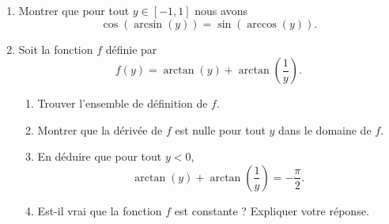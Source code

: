 
\begin{exercice}\label{exoanalyseCTU-0101}
    
    \begin{enumerate}
      \item Montrer que pour tout $y \in [-1,1]$ nous avons 
        \begin{equation}
          \cos (\arcsin(y)) = \sin(\arccos(y)).
        \end{equation}
        \item
          Soit la fonction $f$ définie par 
            \begin{equation}
               f(y)= \arctan(y)+\arctan\left(\frac{1}{ y }\right).
            \end{equation}
            \begin{enumerate}
            \item Trouver l'ensemble de définition de $f$.
              \item Montrer que la dérivée de $f$ est nulle pour tout $y$ dans le domaine de $f$.
              \item En déduire que pour tout \( y<0\),
            \begin{equation}
                \arctan(y)+\arctan\left(\frac{1}{ y }\right)=-\frac{ \pi }{ 2 }.
            \end{equation}
          \item Est-il vrai que la fonction $f$ est constante ? Expliquer votre réponse. 
            \end{enumerate}
          
            
    \end{enumerate}

\end{exercice}
